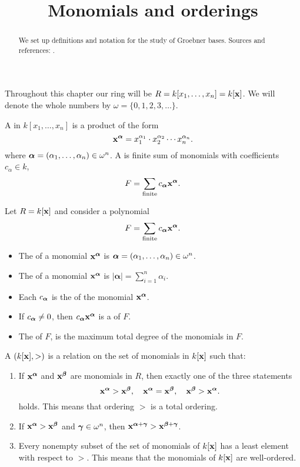 \documentclass{ximera}
\title{Monomials and orderings}
\begin{document}
\begin{abstract}
  We set up definitions and notation for the study of Groebner
  bases. Sources and references: \cite{CLO2007,hS2003}.
\end{abstract}
\maketitle

Throughout this chapter our ring will be $R=k[x_1,\dots,x_n] =
k[\mathbf{x}]$. We will denote the whole numbers by $\omega =
\{0,1,2,3,\dots\}$.


\begin{definition}
  A  in $k[x_1,\dots,x_n]$ is a product of the form
  \[
  \mathbf{x}^{{\boldsymbol\alpha}} = x_1^{\alpha_1}\cdot x_2^{\alpha_2}  \cdots x_n^{\alpha_n}.
  \]
  where ${\boldsymbol\alpha} = (\alpha_1,\dots,\alpha_n) \in
  \omega^n$.  A  is finite sum of monomials with
  coefficients $c_\alpha\in k$,
  \[
  F = \sum_{\mathrm{finite}} c_{{\boldsymbol\alpha}} \mathbf{x}^{{\boldsymbol\alpha}}.
  \]
\end{definition}


\begin{definition}
  Let $R = k[\mathbf{x}]$ and consider a polynomial
  \[
  F =  \sum_{\mathrm{finite}} c_{{\boldsymbol\alpha}} \mathbf{x}^{{\boldsymbol\alpha}}.
  \]
  \begin{itemize}
    \item The  of a monomial $\mathbf{x}^{{\boldsymbol\alpha}}$ is
      ${\boldsymbol\alpha}=(\alpha_1,\dots,\alpha_n)\in \omega^n$.
    \item The  of a monomial $\mathbf{x}^{{\boldsymbol\alpha}}$ is
      $|\boldsymbol{\alpha}| = \sum_{i=1}^n \alpha_i$.
    \item Each $c_{{\boldsymbol\alpha}}$ is the  of the
      monomial $\mathbf{x}^{{\boldsymbol\alpha}}$.
    \item If $c_{{\boldsymbol\alpha}} \ne 0$, then
      $c_{{\boldsymbol\alpha}}\mathbf{x}^{{\boldsymbol\alpha}}$ is a  of
      $F$.
    \item The  of $F$, is the maximum total degree
      of the monomials in $F$.
  \end{itemize}
\end{definition}



\begin{definition}
  A  $(k[\mathbf{x}],>)$ is a relation on the set of
  monomials in $k[\mathbf{x}]$ such that:
  \begin{enumerate}
  \item If $\mathbf{x}^{{\boldsymbol\alpha}}$ and $\mathbf{x}^{{\boldsymbol\beta}}$ are
    monomials in $R$, then exactly one of the three statements
      \[
      \mathbf{x}^{{\boldsymbol\alpha}} > \mathbf{x}^{{\boldsymbol\beta}},\quad \mathbf{x}^{{\boldsymbol\alpha}} = \mathbf{x}^{{\boldsymbol\beta}},
      \quad \mathbf{x}^{{\boldsymbol\beta}} > \mathbf{x}^{{\boldsymbol\alpha}}.
      \]
      holds. This means that ordering $>$ is a total ordering.
    \item If $\mathbf{x}^{{\boldsymbol\alpha}}>\mathbf{x}^{{\boldsymbol\beta}}$ and
      ${\boldsymbol\gamma}\in\omega^n$, then
      $\mathbf{x}^{{\boldsymbol\alpha}+{\boldsymbol\gamma}}>\mathbf{x}^{{\boldsymbol\beta}+{\boldsymbol\gamma}}$.
    \item Every nonempty subset of the set of monomials of $k[\mathbf{x}]$ has
      a least element with respect to $>$. This means that the
      monomials of $k[\mathbf{x}]$ are well-ordered.
  \end{enumerate}
\end{definition}
\end{document}
